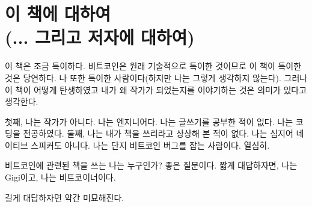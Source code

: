 
\def\bitcoinB{\leavevmode
  {\setbox0=\hbox{\textsf{B}}%
    \dimen0\ht0 \advance\dimen0 0.2ex
    \ooalign{\hfil \box0\hfil\cr
      \hfil\vrule height \dimen0 depth.2ex\hfil\cr
    }%
  }%
}

\chapter*{이 책에 대하여 \\ (... 그리고 저자에 대하여)}


이 책은 조금 특이하다. 
비트코인은 원래 기술적으로 특이한 것이므로 이 책이 특이한 것은 당연하다.
나 또한 특이한 사람이다(하지만 나는 그렇게 생각하지 않는다). 
그러나 이 책이 어떻게 탄생하였고 내가 왜 작가가 되었는지를 이야기하는 것은 의미가 있다고 생각한다.


첫째, 나는 작가가 아니다. 나는 엔지니어다. 나는 글쓰기를 공부한 적이 없다. 나는 코딩을 전공하였다. 
둘째, 나는 내가 책을 쓰리라고 상상해 본 적이 없다. 나는 심지어 네이티브 스피커도 아니다. 
나는 단지 비트코인 버그를 잡는 사람이다. 열심히.



비트코인에 관련된 책을 쓰는 나는 누구인가? 좋은 질문이다. 
짧게 대답하자면, 나는 Gigi이고, 나는 비트코이너이다.

길게 대답하자면 약간 미묘해진다.

